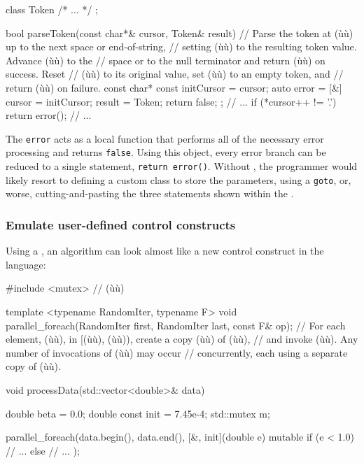 \begin{emcppslisting}
class Token { /* ... */ };

bool parseToken(const char*& cursor, Token& result)
    // Parse the token at (ù{}ù) up to the next space or end-of-string,
    // setting (ù{}ù) to the resulting token value.  Advance (ù{}ù) to the
    // space or to the null terminator and return (ù{}ù) on success.  Reset
    // (ù{}ù) to its original value, set (ù{}ù) to an empty token, and
    // return (ù{}ù) on failure.
{
    const char* const initCursor = cursor;
    auto error = [&]
    {
        cursor = initCursor;
        result = Token{};
        return false;
    };
    // ...
    if (*cursor++ != '.')
    {
        return error();
    }
    // ...
}
\end{emcppslisting}
    

The \lstinline!error!  acts as a local function that
performs all of the necessary error processing and returns
\lstinline!false!. Using this object, every error branch can be reduced to
a single statement, \lstinline!return!~\lstinline!error()!. Without
, the programmer would likely resort to
defining a custom class to store the parameters, using a \lstinline!goto!,
or, worse, cutting-and-pasting the three statements shown within the
.

\subsubsection[Emulate user-defined control constructs]{Emulate user-defined control constructs}\label{emulate-user-defined-control-constructs}

Using a , an algorithm can look almost like a
new control construct in the language:

\begin{emcppslisting}
#include <mutex>  // (ù{}ù)

template <typename RandomIter, typename F>
void parallel_foreach(RandomIter first, RandomIter last, const F& op);
    // For each element, (ù{}ù), in [(ù{}ù), (ù{}ù)), create a copy (ù{}ù) of (ù{}ù),
    // and invoke (ù{}ù).  Any number of invocations of (ù{}ù) may occur
    // concurrently, each using a separate copy of (ù{}ù).

void processData(std::vector<double>& data)
{
    double       beta    = 0.0;
    double const init = 7.45e-4;
    std::mutex m;

    parallel_foreach(data.begin(), data.end(), [&, init](double e) mutable
    {
        if (e < 1.0)
        {
           // ...
        }
        else
        {
           // ...
        }
    });
}
\end{emcppslisting}
    

